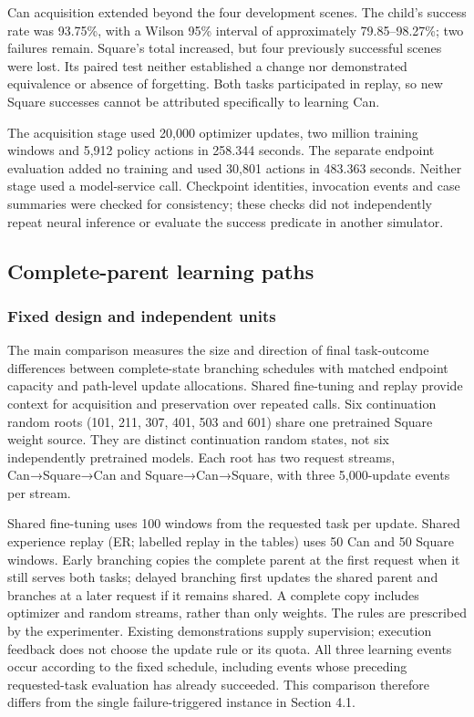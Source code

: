 \documentclass[10pt,letterpaper]{article}
\begin{document}
Can acquisition extended beyond the four development scenes. The child's
success rate was 93.75\%, with a Wilson 95\% interval of approximately
79.85--98.27\%; two failures remain. Square's total increased, but four
previously successful scenes were lost. Its paired test neither
established a change nor demonstrated equivalence or absence of
forgetting. Both tasks participated in replay, so new Square successes
cannot be attributed specifically to learning Can.

The acquisition stage used 20,000 optimizer updates, two million
training windows and 5,912 policy actions in 258.344 seconds. The
separate endpoint evaluation added no training and used 30,801 actions
in 483.363 seconds. Neither stage used a model-service call. Checkpoint
identities, invocation events and case summaries were checked for
consistency; these checks did not independently repeat neural inference
or evaluate the success predicate in another simulator.

\subsection{Complete-parent learning
paths}\label{complete-parent-learning-paths}

\subsubsection{Fixed design and independent
units}\label{fixed-design-and-independent-units}

The main comparison measures the size and direction of final
task-outcome differences between complete-state branching schedules with
matched endpoint capacity and path-level update allocations. Shared
fine-tuning and replay provide context for acquisition and preservation
over repeated calls. Six continuation random roots (101, 211, 307, 401,
503 and 601) share one pretrained Square weight source. They are
distinct continuation random states, not six independently pretrained
models. Each root has two request streams, Can→Square→Can and
Square→Can→Square, with three 5,000-update events per stream.

Shared fine-tuning uses 100 windows from the requested task per update.
Shared experience replay (ER; labelled replay in the tables) uses 50 Can
and 50 Square windows. Early branching copies the complete parent at the
first request when it still serves both tasks; delayed branching first
updates the shared parent and branches at a later request if it remains
shared. A complete copy includes optimizer and random streams, rather
than only weights. The rules are prescribed by the experimenter.
Existing demonstrations supply supervision; execution feedback does not
choose the update rule or its quota. All three learning events occur
according to the fixed schedule, including events whose preceding
requested-task evaluation has already succeeded. This comparison
therefore differs from the single failure-triggered instance in Section
4.1.
\end{document}
